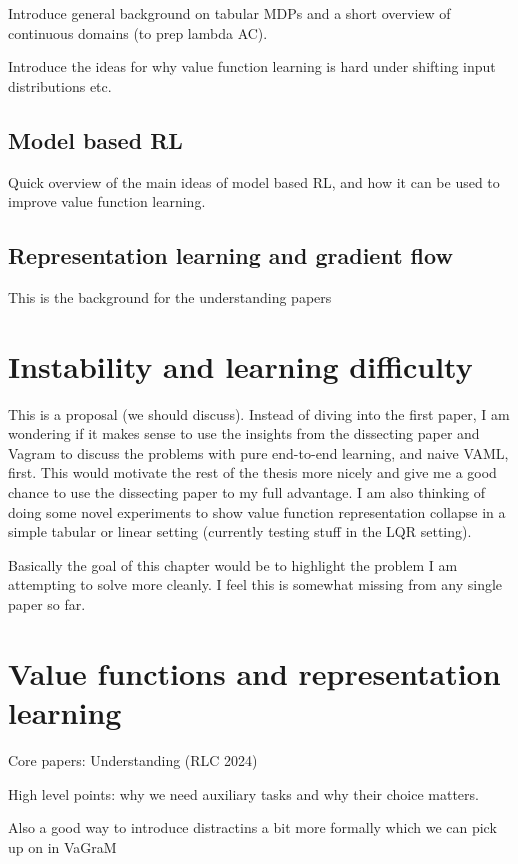 Introduce general background on tabular MDPs and a short overview of continuous domains (to prep lambda AC).

Introduce the ideas for why value function learning is hard under shifting input distributions etc.

\subsection{Model based RL}

Quick overview of the main ideas of model based RL, and how it can be used to improve value function learning.

\subsection{Representation learning and gradient flow}

This is the background for the understanding papers

\section{Instability and learning difficulty}

This is a proposal (we should discuss).
Instead of diving into the first paper, I am wondering if it makes sense to use the insights from the dissecting paper and Vagram to discuss the problems with pure end-to-end learning, and naive VAML, first.
This would motivate the rest of the thesis more nicely and give me a good chance to use the dissecting paper to my full advantage.
I am also thinking of doing some novel experiments to show value function representation collapse in a simple tabular or linear setting (currently testing stuff in the LQR setting).

Basically the goal of this chapter would be to highlight the problem I am attempting to solve more cleanly.
I feel this is somewhat missing from any single paper so far.

\section{Value functions and representation learning}
Core papers:
Understanding (RLC 2024)

High level points: why we need auxiliary tasks and why their choice matters.

Also a good way to introduce distractins a bit more formally which we can pick up on in VaGraM

